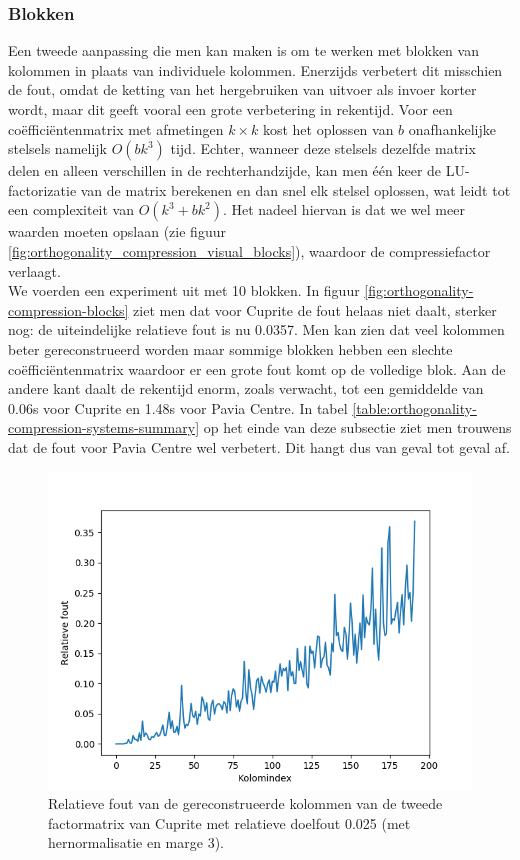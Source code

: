 \subsubsection{Blokken}

Een tweede aanpassing die men kan maken is om te werken met blokken van kolommen in plaats van individuele kolommen. Enerzijds verbetert dit misschien de fout, omdat de ketting van het hergebruiken van uitvoer als invoer korter wordt, maar dit geeft vooral een grote verbetering in rekentijd. Voor een co\"effici\"entenmatrix met afmetingen $k \times k$ kost het oplossen van $b$ onafhankelijke stelsels namelijk $O(bk^3)$ tijd. Echter, wanneer deze stelsels dezelfde matrix delen en alleen verschillen in de rechterhandzijde, kan men \'e\'en keer de LU-factorizatie van de matrix berekenen en dan snel elk stelsel oplossen, wat leidt tot een complexiteit van $O(k^3 + bk^2)$. Het nadeel hiervan is dat we wel meer waarden moeten opslaan (zie figuur \ref{fig:orthogonality_compression_visual_blocks}), waardoor de compressiefactor verlaagt.\\

We voerden een experiment uit met 10 blokken. In figuur \ref{fig:orthogonality-compression-blocks} ziet men dat voor Cuprite de fout helaas niet daalt, sterker nog: de uiteindelijke relatieve fout is nu 0.0357. Men kan zien dat veel kolommen beter gereconstrueerd worden maar sommige blokken hebben een slechte co\"effici\"entenmatrix waardoor er een grote fout komt op de volledige blok. Aan de andere kant daalt de rekentijd enorm, zoals verwacht, tot een gemiddelde van 0.06s voor Cuprite en 1.48s voor Pavia Centre. In tabel \ref{table:orthogonality-compression-systems-summary} op het einde van deze subsectie ziet men trouwens dat de fout voor Pavia Centre wel verbetert. Dit hangt dus van geval tot geval af.

\begin{figure}[H]
  \centering
  \includegraphics[scale=0.7]{images/orthogonality_compression_margin.png}
  \caption{Relatieve fout van de gereconstrueerde kolommen van de tweede factormatrix van Cuprite met relatieve doelfout 0.025 (met hernormalisatie en marge 3).}
\label{fig:orthogonality-compression-margin}
\end{figure}

